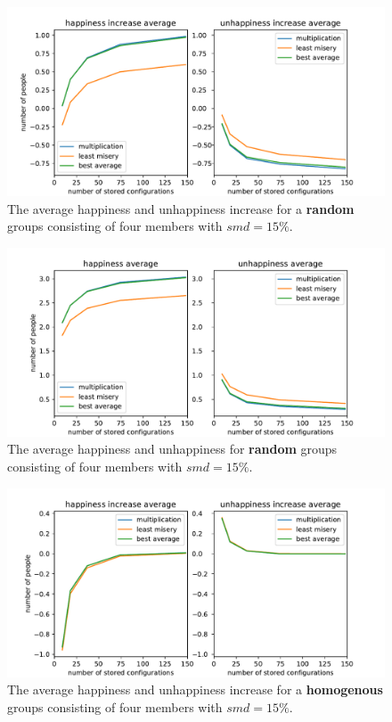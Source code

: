 \begin{figure}
    \centering
    \includegraphics[width=1\textwidth]{./figures/60_evaluation/random_happy_unhappy_increase_amount-1000_smd-15.pdf}
    \caption{The average happiness and unhappiness increase for a \textbf{random} groups consisting of four members with $smd=15\%$.}
    \label{fig:Evaluation:RandomGroupIncrease}
\end{figure}

\begin{figure}
    \centering
    \includegraphics[width=1\textwidth]{./figures/60_evaluation/random_happy_unhappy_total_group_amount-1000_smd-15.pdf}
    \caption{The average happiness and unhappiness for \textbf{random} groups consisting of four members with $smd=15\%$.}
    \label{fig:Evaluation:RandomGroupTotal}
\end{figure}


\begin{figure}
    \centering
    \includegraphics[width=1\textwidth]{./figures/60_evaluation/homogenous_happy_unhappy_increase_amount-1000_smd-15.pdf}
    \caption{The average happiness and unhappiness increase for a \textbf{homogenous} groups consisting of four members with $smd=15\%$.}
    \label{fig:Evaluation:HomogenousGroupIncrease}
\end{figure}

